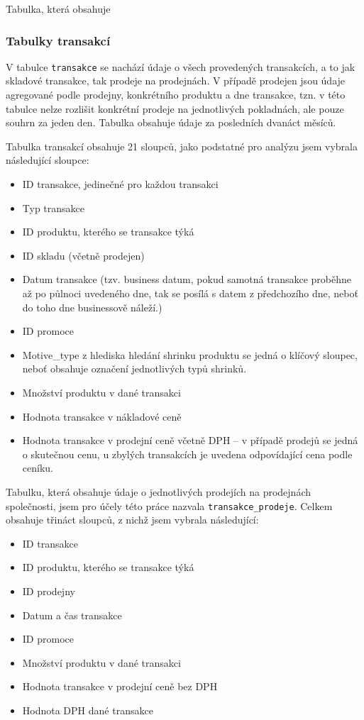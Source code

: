 Tabulka, která obsahuje 

\subsubsection{Tabulky transakcí}
V tabulce \texttt{transakce} se nachází údaje o všech provedených transakcích, a to jak skladové transakce, tak prodeje na prodejnách. V případě prodejen jsou údaje agregované podle prodejny, konkrétního produktu a dne transakce, tzn. v této tabulce nelze rozlišit konkrétní prodeje na jednotlivých pokladnách, ale pouze souhrn za jeden den. Tabulka obsahuje údaje za posledních dvanáct měsíců.

Tabulka transakcí obsahuje 21 sloupců, jako podstatné pro analýzu jsem vybrala následující sloupce:

\begin{itemize}
    \item ID transakce, jedinečné pro každou transakci
    \item Typ transakce
    \item ID produktu, kterého se transakce týká
    \item ID skladu (včetně prodejen)
    \item Datum transakce (tzv. business datum, pokud samotná transakce proběhne až po půlnoci uvedeného dne, tak se posílá s datem z předchozího dne, neboť do toho dne businessově náleží.)
    \item ID promoce 
    \item Motive\_type z hlediska hledání shrinku produktu se jedná o klíčový sloupec, neboť obsahuje označení jednotlivých typů shrinků.
    \item Množství produktu v dané transakci
    \item Hodnota transakce v nákladové ceně
    \item Hodnota transakce v prodejní ceně včetně DPH -- v případě prodejů se jedná o skutečnou cenu, u zbylých transakcích je uvedena odpovídající cena podle ceníku.
\end{itemize}

Tabulku, která obsahuje údaje o jednotlivých prodejích na prodejnách společnosti, jsem pro účely této práce nazvala \texttt{transakce\_prodeje}. Celkem obsahuje třináct sloupců, z nichž jsem vybrala následující:

\begin{itemize}
    \item ID transakce
    \item ID produktu, kterého se transakce týká
    \item ID prodejny
    \item Datum a čas transakce 
    \item ID promoce
    \item Množství produktu v dané transakci
    \item Hodnota transakce v prodejní ceně bez DPH
    \item Hodnota DPH dané transakce
\end{itemize}

